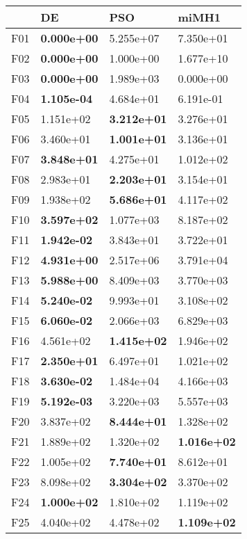 \documentclass[10pt,a4paper]{article}
\begin{document}
\begin{table}[h]
	\centering
	\begin{tabular}{|l|l|l|l|}
		\hline
		{} &         DE &        PSO &      miMH1 \\ \hline
		F01  &  \textbf{0.000e+00} &  5.255e+07 &  7.350e+01 \\
		F02  &  \textbf{0.000e+00} &  1.000e+00 &  1.677e+10 \\
		F03  &  \textbf{0.000e+00} &  1.989e+03 &  0.000e+00 \\
		F04  &  \textbf{1.105e-04} &  4.684e+01 &  6.191e-01 \\
		F05  &  1.151e+02 &  \textbf{3.212e+01} &  3.276e+01 \\
		F06  &  3.460e+01 &  \textbf{1.001e+01} &  3.136e+01 \\
		F07  &  \textbf{3.848e+01} &  4.275e+01 &  1.012e+02 \\
		F08  &  2.983e+01 &  \textbf{2.203e+01} &  3.154e+01 \\
		F09  &  1.938e+02 &  \textbf{5.686e+01} &  4.117e+02 \\
		F10  &  \textbf{3.597e+02} &  1.077e+03 &  8.187e+02 \\
		F11  &  \textbf{1.942e-02} &  3.843e+01 &  3.722e+01 \\
		F12  &  \textbf{4.931e+00} &  2.517e+06 &  3.791e+04 \\
		F13  &  \textbf{5.988e+00} &  8.409e+03 &  3.770e+03 \\
		F14  &  \textbf{5.240e-02} &  9.993e+01 &  3.108e+02 \\
		F15  &  \textbf{6.060e-02} &  2.066e+03 &  6.829e+03 \\
		F16  &  4.561e+02 &  \textbf{1.415e+02} &  1.946e+02 \\
		F17  &  \textbf{2.350e+01} &  6.497e+01 &  1.021e+02 \\
		F18  &  \textbf{3.630e-02} &  1.484e+04 &  4.166e+03 \\
		F19  &  \textbf{5.192e-03} &  3.220e+03 &  5.557e+03 \\
		F20  &  3.837e+02 &  \textbf{8.444e+01} &  1.328e+02 \\
		F21  &  1.889e+02 &  1.320e+02 &  \textbf{1.016e+02} \\
		F22  &  1.005e+02 &  \textbf{7.740e+01} &  8.612e+01 \\
		F23  &  8.098e+02 &  \textbf{3.304e+02} &  3.370e+02 \\
		F24  &  \textbf{1.000e+02} &  1.810e+02 &  1.119e+02 \\
		F25  &  4.040e+02 &  4.478e+02 &  \textbf{1.109e+02} \\

\end{tabular}
\end{table}
\end{document}
